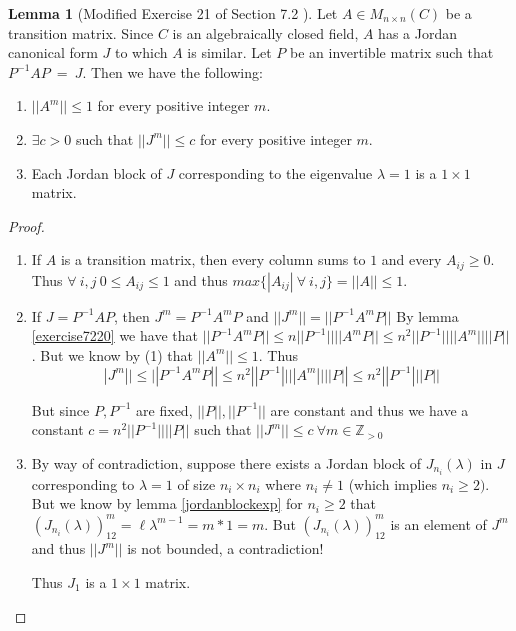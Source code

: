 \documentclass{amsart}
\theoremstyle{definition}
\newtheorem{lemma}[theorem]{Lemma}
\theoremstyle{remark}
\numberwithin{equation}{section}
\begin{document}
\begin{lemma}[Modified Exercise 21 of Section 7.2 \cite{friedberg2003linear}]\label{exericse7221}
	Let $A \in M_{n \times n}(C)$ be a transition matrix.
	Since $C$ is an algebraically closed field, $A$ has a Jordan canonical form $J$ to which $A$ is similar.
	Let $P$ be an invertible matrix such that $P^{-1}AP\ =\ J$.
	Then we have the following:

	\begin{enumerate}
		
		\item $||A^m|| \leq 1$ for every positive integer $m$.
		\item $\exists c > 0$ such that $||J^m|| \leq c$ for every positive integer $m$.
		\item Each Jordan block of $J$ corresponding to the eigenvalue $\lambda = 1$ is a $1 \times 1$ matrix.

	\end{enumerate}

\end{lemma}

\begin{proof} \leavevmode

\begin{enumerate}


	\item 
		If $A$ is a transition matrix, then every column sums to $1$ and every $A_{ij} \geq 0$.
		Thus $\forall\ i, j\ 0 \leq A_{ij} \leq 1$ and thus $ max \{|A_{ij}|\ \forall\ i, j \} = ||A|| \leq 1$.


	\item
		If $J = P^{-1}AP$, then $J^m  = P^{-1}A^mP$ and $||J^m|| = || P^{-1}A^mP ||$
		By lemma \ref{exercise7220} we have that $|| P^{-1}A^mP || \leq n||P^{-1}||||A^mP|| \leq n^2 ||P^{-1}|| ||A^m||| |P||$.
		But we know by (1) that $||A^m|| \leq 1$.
		Thus 
		$$ |J^m|| \leq || P^{-1}A^mP || \leq n^2 ||P^{-1}|| ||A^m||| |P|| \leq n^2 ||P^{-1}|| |P||$$

		But since $P, P^{-1}$ are fixed, $||P||, ||P^{-1}||$ are constant and thus we have a constant $c = n^2 ||P^{-1}|| ||P||$ such that $||J^m|| \leq c\ \forall m \in \mathbb{Z}_{>0}$

		
	\item \label{jordan1size}
		By way of contradiction, suppose there exists a  Jordan block of $J_{n_i}(\lambda)$ in $J$ corresponding to $\lambda = 1$ of size $n_i \times n_i$ where $n_i \neq 1$ (which implies $n_i \geq 2)$.
		But we know by lemma \ref{jordanblockexp} for $n_i \geq 2$ that $(J_{n_i}(\lambda))^{m}_{12} = \ell \lambda^{m -1} = m * 1 = m$.
		But $(J_{n_i}(\lambda))^{m}_{12}$ is an element of $J^m$ and thus $||J^m||$ is not bounded, a contradiction!

		Thus $J_1$ is a $1 \times 1 $ matrix.



\end{enumerate}


\end{proof}
\end{document}

